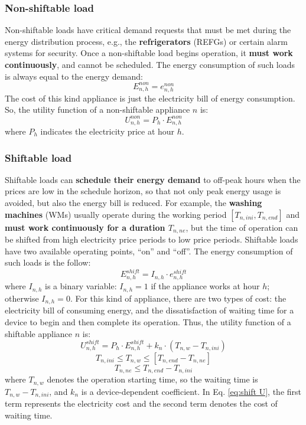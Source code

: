 \subsubsection{Non-shiftable load}
Non-shiftable loads have critical demand requests that must be met during the energy distribution process, e.g., the \textbf{refrigerators} (REFGs) or certain alarm systems for security. Once a non-shiftable load begins operation, it \textbf{must
work continuously}, and cannot be scheduled. The energy consumption of such loads is always equal to the energy demand:
\begin{equation}
    E^{non}_{n,h} = e^{non}_{n,h}
\end{equation}
The cost of this kind appliance is just the electricity bill of energy consumption. So, the utility function of a non-shiftable
appliance $n$ is:
\begin{equation}
    U^{non}_{n,h} = P_h \cdot E^{non}_{n,h}
\end{equation}
where $P_h$ indicates the electricity price at hour $h$.

\subsubsection{Shiftable load}
Shiftable loads can \textbf{schedule their energy demand} to off-peak hours when the prices are low in the schedule horizon, so
that not only peak energy usage is avoided, but also the energy bill is reduced. For example, the \textbf{washing machines} (WMs) usually operate during the working period $[T_{n,ini}, T_{n,end}]$ and \textbf{must work continuously for a duration $T_{n,ne}$}, but the time of operation can be shifted from high electricity price periods to low price periods. Shiftable loads have two available operating points, “on” and “off”. The energy consumption of such loads is the follow:
\begin{equation}
    E^{shift}_{n,h} = I_{n,h} \cdot e^{shift}_{n,h}
\end{equation}
where $I_{n,h}$ is a binary variable: $I_{n,h} = 1$ if the appliance works at hour $h$; otherwise $I_{n,h} = 0$. For this kind of appliance, there are two types of cost: the electricity bill of consuming energy, and the dissatisfaction of waiting time for a device to begin and then complete its operation. Thus, the utility function of a shiftable appliance $n$ is:
\begin{equation}
\label{eq:shift U}
    U^{shift}_{n,h} = P_h \cdot E^{shift}_{n,h}+k_n \cdot (T_{n,w}-T_{n,ini})
\end{equation}
\begin{equation}
    T_{n,ini} \leq T_{n,w} \leq [T_{n,end}-T_{n,ne}]
\end{equation}
\begin{equation}
    T_{n,ne} \leq T_{n,end}-T_{n,ini}
\end{equation}
where $T_{n,w}$ denotes the operation starting time, so the waiting time is $T_{n,w} - T_{n,ini}$, and $k_n$ is a device-dependent coefficient. In Eq. \ref{eq:shift U}, the first term represents the electricity cost and the second term denotes the cost of waiting time.

